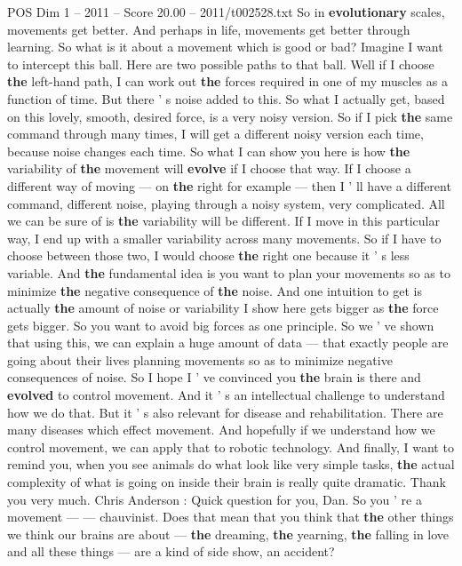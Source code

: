 \begin{textsample}{POS Dim 1 – 2011 – Score 20.00 – 2011/t002528.txt}
So in \textbf{evolutionary} scales, movements get better.
And perhaps in life, movements get better through learning.
So what is it about a movement which is good or bad?
Imagine I want to intercept this ball.
Here are two possible paths to that ball.
Well if I choose \textbf{the} left-hand path, I can work out \textbf{the} forces required in one of my muscles as a function of time.
But there ' s noise added to this.
So what I actually get, based on this lovely, smooth, desired force, is a very noisy version.
So if I pick \textbf{the} same command through many times, I will get a different noisy version each time, because noise changes each time.
So what I can show you here is how \textbf{the} variability of \textbf{the} movement will \textbf{evolve} if I choose that way.
If I choose a different way of moving — on \textbf{the} right for example — then I ' ll have a different command, different noise, playing through a noisy system, very complicated.
All we can be sure of is \textbf{the} variability will be different.
If I move in this particular way, I end up with a smaller variability across many movements.
So if I have to choose between those two, I would choose \textbf{the} right one because it ' s less variable.
And \textbf{the} fundamental idea is you want to plan your movements so as to minimize \textbf{the} negative consequence of \textbf{the} noise.
And one intuition to get is actually \textbf{the} amount of noise or variability I show here gets bigger as \textbf{the} force gets bigger.
So you want to avoid big forces as one principle.
So we ' ve shown that using this, we can explain a huge amount of data — that exactly people are going about their lives planning movements so as to minimize negative consequences of noise.
So I hope I ' ve convinced you \textbf{the} brain is there and \textbf{evolved} to control movement.
And it ' s an intellectual challenge to understand how we do that.
But it ' s also relevant for disease and rehabilitation.
There are many diseases which effect movement.
And hopefully if we understand how we control movement, we can apply that to robotic technology.
And finally, I want to remind you, when you see animals do what look like very simple tasks, \textbf{the} actual complexity of what is going on inside their brain is really quite dramatic.
Thank you very much.
Chris Anderson : Quick question for you, Dan.
So you ' re a movement — — chauvinist.
Does that mean that you think that \textbf{the} other things we think our brains are about — \textbf{the} dreaming, \textbf{the} yearning, \textbf{the} falling in love and all these things — are a kind of side show, an accident?

\end{textsample}
